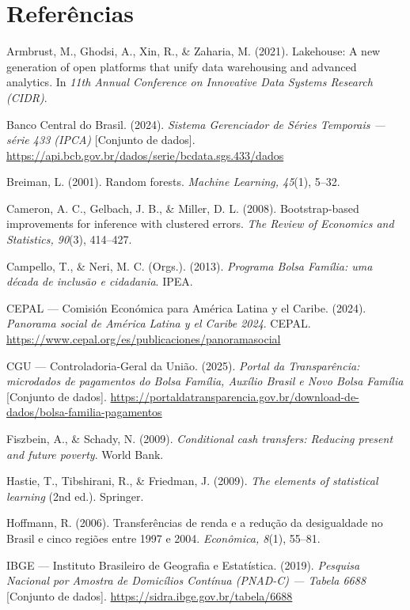 \documentclass[12pt,a4paper,oneside]{article}
\begin{document}
\section*{Referências}
\begin{singlespace}\small
\newcommand{\refitem}{\par\smallskip\noindent\hangindent=1.25cm\relax}

\refitem Armbrust, M., Ghodsi, A., Xin, R., \& Zaharia, M. (2021). Lakehouse: A new generation of open platforms that unify data warehousing and advanced analytics. In \textit{11th Annual Conference on Innovative Data Systems Research (CIDR)}.

\refitem Banco Central do Brasil. (2024). \textit{Sistema Gerenciador de Séries Temporais --- série 433 (IPCA)} [Conjunto de dados]. \url{https://api.bcb.gov.br/dados/serie/bcdata.sgs.433/dados}

\refitem Breiman, L. (2001). Random forests. \textit{Machine Learning, 45}(1), 5--32.

\refitem Cameron, A. C., Gelbach, J. B., \& Miller, D. L. (2008). Bootstrap-based improvements for inference with clustered errors. \textit{The Review of Economics and Statistics, 90}(3), 414--427.

\refitem Campello, T., \& Neri, M. C. (Orgs.). (2013). \textit{Programa Bolsa Família: uma década de inclusão e cidadania}. IPEA.

\refitem CEPAL --- Comisión Económica para América Latina y el Caribe. (2024). \textit{Panorama social de América Latina y el Caribe 2024}. CEPAL. \url{https://www.cepal.org/es/publicaciones/panoramasocial}

\refitem CGU --- Controladoria-Geral da União. (2025). \textit{Portal da Transparência: microdados de pagamentos do Bolsa Família, Auxílio Brasil e Novo Bolsa Família} [Conjunto de dados]. \url{https://portaldatransparencia.gov.br/download-de-dados/bolsa-familia-pagamentos}

\refitem Fiszbein, A., \& Schady, N. (2009). \textit{Conditional cash transfers: Reducing present and future poverty}. World Bank.

\refitem Hastie, T., Tibshirani, R., \& Friedman, J. (2009). \textit{The elements of statistical learning} (2nd ed.). Springer.

\refitem Hoffmann, R. (2006). Transferências de renda e a redução da desigualdade no Brasil e cinco regiões entre 1997 e 2004. \textit{Econômica, 8}(1), 55--81.

\refitem IBGE --- Instituto Brasileiro de Geografia e Estatística. (2019). \textit{Pesquisa Nacional por Amostra de Domicílios Contínua (PNAD-C) --- Tabela 6688} [Conjunto de dados]. \url{https://sidra.ibge.gov.br/tabela/6688}


\end{singlespace}
\end{document}
